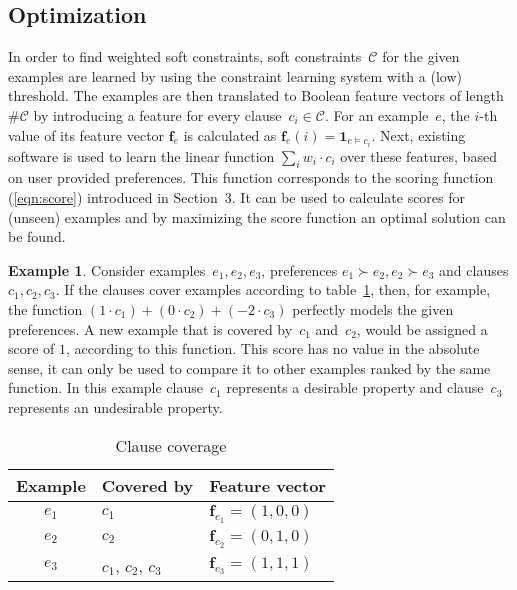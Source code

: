 \documentclass[letterpaper]{article}
\newcommand{\sym}[1]{\ensuremath{\mathcal{#1}}}
\theoremstyle{definition}
\newtheorem{example}{Example}
\begin{document}
\subsection{Optimization}
In order to find weighted soft constraints, soft constraints~\sym{C} for the given examples are learned by using the constraint learning system with a (low) threshold.
The examples are then translated to Boolean feature vectors of length $\# \sym{C}$ by introducing a feature for every clause~$c_i \in \sym{C}$.
For an example~$e$, the $i$-th value of its feature vector $\mathbf{f}_e$ is calculated as $\mathbf{f}_e(i) = \mathbf{1}_{e \models c_i}$.
Next, existing software is used to learn the linear function $\sum_i w_i \cdot c_i$ over these features, based on user provided preferences.
This function corresponds to the scoring function (\ref{eqn:score}) introduced in Section~3.
It can be used to calculate scores for (unseen) examples and by maximizing the score function an optimal solution can be found.

\begin{example}
  \label{ex:features}
  Consider examples~$e_1, e_2, e_3$, preferences $e_1 \succ e_2, e_2 \succ e_3$ and clauses $c_1, c_2, c_3$.
  If the clauses cover examples according to table~\ref{tbl:cover_examples}, then, for example, the function $(1 \cdot c_1) + (0\cdot c_2) + (-2\cdot c_3)$ perfectly models the given preferences.
  A new example that is covered by~$c_1$ and~$c_2$, would be assigned a score of $1$, according to this function.
  This score has no value in the absolute sense, it can only be used to compare it to other examples ranked by the same function.
  In this example clause~$c_1$ represents a desirable property and clause~$c_3$ represents an undesirable property.

  \begin{table}
  \caption{Clause coverage}
  \label{tbl:cover_examples}
  \begin{tabularx}{\linewidth}{c|l|X}
    \textbf{Example} & \textbf{Covered by} & \textbf{Feature vector}\\
    \toprule
    $e_1$             & $c_1$               & $\mathbf{f}_{e_1} = (1, 0, 0)$ \\
    $e_2$             & $c_2$               & $\mathbf{f}_{e_2} = (0, 1, 0)$ \\
    $e_3$             & $c_1$, $c_2$, $c_3$ & $\mathbf{f}_{e_3} = (1, 1, 1)$ \\
  \end{tabularx}
  \end{table}
\end{example}
\end{document}
